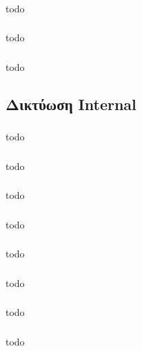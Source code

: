 \documentclass[a4paper, 12pt]{article}
\begin{document}
		\subsubsection{}
			todo

		\subsubsection{}
			todo

		\subsubsection{}
			todo

	\subsection{Δικτύωση Internal}

		\subsubsection{}
			todo

		\subsubsection{}
			todo

		\subsubsection{}
			todo

		\subsubsection{}
			todo

		\subsubsection{}
			todo

		\subsubsection{}
			todo

		\subsubsection{}
			todo

		\subsubsection{}
			todo
\end{document}
